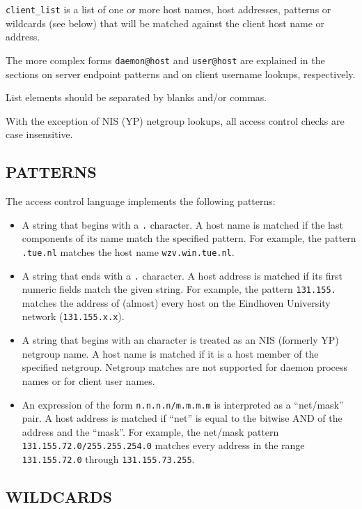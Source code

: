 \documentclass[11pt,twoside,onecolumn]{book}
\begin{document}
{\tt client\_list} is a list
of one or more host names, host addresses, patterns or wildcards (see
below) that will be matched against the client host name or address.

The more complex forms {\tt daemon@host} and {\tt user@host} are
explained in the sections on server endpoint patterns and on client
username lookups, respectively.

List elements should be separated by blanks and/or commas.  

With the exception of NIS (YP) netgroup lookups, all access control
checks are case insensitive.

\subsection*{PATTERNS}

The access control language implements the following patterns:

\begin{itemize}

\item A string that begins with a {\tt .} character. A host name is matched if
the last components of its name match the specified pattern.  For
example, the pattern {\tt .tue.nl} matches the host name
{\tt wzv.win.tue.nl}.

\item A string that ends with a {\tt .} character. A host address is matched if
its first numeric fields match the given string.  For example, the
pattern {\tt 131.155.} matches the address of (almost) every host on the
Eindhoven University network ({\tt 131.155.x.x}).

\item A string that begins with an {\tt \@} character is treated as an NIS
(formerly YP) netgroup name. A host name is matched if it is a host
member of the specified netgroup. Netgroup matches are not supported
for daemon process names or for client user names.

\item An expression of the form {\tt n.n.n.n/m.m.m.m} is interpreted as a
``net/mask'' pair. A host address is matched if ``net'' is equal to the
bitwise AND of the address and the ``mask''. For example, the net/mask
pattern {\tt 131.155.72.0/255.255.254.0} matches every address in the
range {\tt 131.155.72.0} through {\tt 131.155.73.255}.

\end{itemize}

\subsection*{WILDCARDS}
\end{document}
